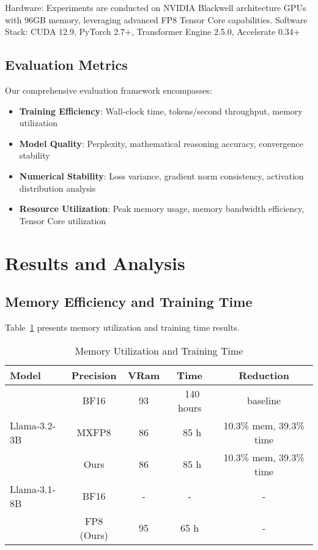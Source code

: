 \documentclass[conference]{IEEEtran}
\begin{document}
Hardware: Experiments are conducted on NVIDIA Blackwell architecture GPUs with 96GB memory, leveraging advanced FP8 Tensor Core capabilities.
Software Stack: CUDA 12.9, PyTorch 2.7+, Transformer Engine 2.5.0, Accelerate 0.34+

\subsection{Evaluation Metrics}

Our comprehensive evaluation framework encompasses:

\begin{itemize}
\item \textbf{Training Efficiency}: Wall-clock time, tokens/second throughput, memory utilization
\item \textbf{Model Quality}: Perplexity, mathematical reasoning accuracy, convergence stability
\item \textbf{Numerical Stability}: Loss variance, gradient norm consistency, activation distribution analysis
\item \textbf{Resource Utilization}: Peak memory usage, memory bandwidth efficiency, Tensor Core utilization
\end{itemize}

\section{Results and Analysis}
\subsection{Memory Efficiency and Training Time}

Table~\ref{tab:memory_scaling} presents memory utilization and training time results.

\begin{table}[htbp]
\centering
\caption{Memory Utilization and Training Time}
\begin{tabular}{@{}lcccc@{}}
\toprule
\textbf{Model} & \textbf{Precision} & \textbf{VRam} & \textbf{Time} & \textbf{Reduction} \\
\midrule
\multirow{3}{*}{Llama-3.2-3B} & BF16 & 93 & ~140 hours & baseline \\
 & MXFP8 & 86 & ~85 h & 10.3\% mem, 39.3\% time \\
 & Ours & 86 & ~85 h & 10.3\% mem, 39.3\% time \\
\midrule
Llama-3.1-8B & BF16 & - & - & - \\
 & FP8 (Ours) & 95 & 65 h & - \\
\bottomrule
\end{tabular}
\label{tab:memory_scaling}
\end{table}
\end{document}
